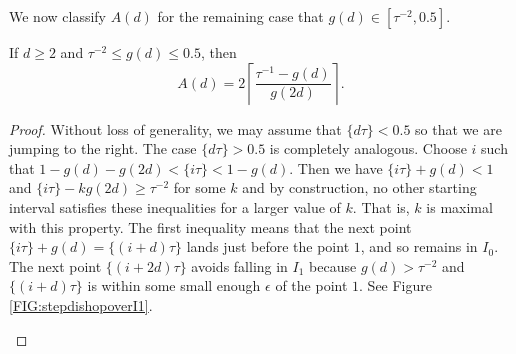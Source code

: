 \documentclass[10pt,a4paper,reqno]{amsart}
\begin{document}
We now classify $A(d)$ for the remaining case that $g(d) \in [\tau^{-2},0.5]$.
\begin{theorem}\label{THM:adformula2}
If $d \geq 2$ and $\tau^{-2} \leq g(d) \leq 0.5$, then
\[A(d)=2\left\lceil \frac{\tau^{-1}-g(d)}{g(2d)}\right\rceil.\]
\end{theorem}
\begin{proof}
Without loss of generality, we may assume that $\{d\tau\}<0.5$ so that we are jumping to the right. The case $\{d\tau\}>0.5$ is completely analogous.
Choose $i$ such that $1-g(d)-g(2d)<\{i\tau\} < 1-g(d)$.
Then we have $\{ i\tau\}+g(d)<1$ and $\{ i\tau\}-kg(2d)\geq \tau^{-2}$ for some $k$ and by construction, no other starting interval satisfies these inequalities for a larger value of $k$. That is, $k$ is maximal with this property. The first inequality means that the next point $\{ i\tau\}+g(d)=\{(i+d)\tau\}$ lands just before the point $1$, and so remains in $I_0$. The next point $\{ (i+2d)\tau\}$ avoids falling in $I_1$ because $g(d) >\tau^{-2}$ and $\{(i+d)\tau\}$ is within some small enough $\epsilon$ of the point $1$. See Figure \ref{FIG:stepdishopoverI1}.

\begin{figure}[ht]
\centering
{}
\end{figure}
\end{proof}
\end{document}
